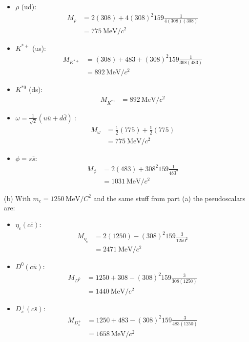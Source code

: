 \documentclass[../main.tex]{subfiles}
\begin{document}
\begin{itemize}
    \item $\rho$ (ud):
    \begin{align*}
        M_{\rho} &= 2(308) + 4(308)^2 159\frac{1}{4(308)(308)} \\
        &= \qty{775}{\MeV/c^2}
    \end{align*}
    \item $K^{*+}$ (us):
    \begin{align*}
        M_{K^{*+}} &= (308) + 483 + (308)^2 159 \frac{1}{308(483)} \\
        &= \qty{892}{\MeV/c^2}
    \end{align*}
    \item $K^{*0}$ (ds):
    \begin{align*}
        M_{K^{*0}} &= \qty{892}{\MeV/c^2}
    \end{align*}
    \item $\omega = \frac{1}{\sqrt{2}}(u\bar u + d \bar d)$ :
    \begin{align*}
        M_{\omega} &= \frac{1}{2}(775) + \frac{1}{2}(775) \\
        &= \qty{775}{\MeV/c^2}
    \end{align*}
    \item $\phi = s\bar s$:
    \begin{align*}
        M_{\phi} &= 2(483) + 308^2 159 \frac{1}{483^2} \\
        &= \qty{1031}{\MeV/c^2}
    \end{align*}
\end{itemize}
(b) With $m_c = \qty{1250}{\MeV/C^2}$ and the same stuff from part (a) the pseudoscalars are:
\begin{itemize}
    \item $\eta_c(c\bar c)$:
    \begin{align*}
        M_{\eta_c} &= 2(1250) - (308)^2 159 \frac{3}{1250^2} \\
        &= \qty{2471}{\MeV/c^2}
    \end{align*}
    \item $D^0(c\bar u)$:
    \begin{align*}
        M_{D^0} &= 1250 + 308 - (308)^2 159 \frac{3}{308(1250)} \\
        &= \qty{1440}{\MeV/c^2}
    \end{align*}
    \item $D_s^+(c \bar s)$:
    \begin{align*}
        M_{D_s^+} &= 1250 + 483 - (308)^2 159 \frac{3}{483(1250)} \\
        &= \qty{1658}{\MeV/c^2}
    \end{align*}
\end{itemize}
\end{document}
